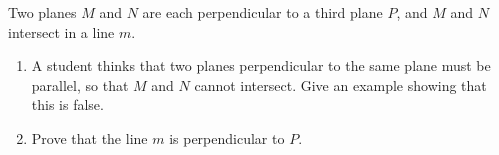 Two planes $M$ and $N$ are each perpendicular to a third plane $P$, and $M$ and $N$ intersect in a line $m$.
\begin{enumerate}
\item[(a)] A student thinks that two planes perpendicular to the same plane must be parallel, so that $M$ and $N$ cannot intersect. Give an example showing that this is false.
\item[(b)] Prove that the line $m$ is perpendicular to $P$.
\end{enumerate}
